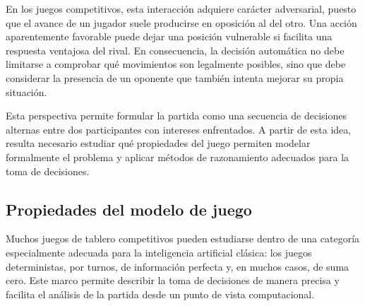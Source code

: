 En los juegos competitivos, esta interacción adquiere carácter adversarial, puesto que el avance de un jugador suele producirse en oposición al del otro. Una acción aparentemente favorable puede dejar una posición vulnerable si facilita una respuesta ventajosa del rival. En consecuencia, la decisión automática no debe limitarse a comprobar qué movimientos son legalmente posibles, sino que debe considerar la presencia de un oponente que también intenta mejorar su propia situación.

Esta perspectiva permite formular la partida como una secuencia de decisiones alternas entre dos participantes con intereses enfrentados. A partir de esta idea, resulta necesario estudiar qué propiedades del juego permiten modelar formalmente el problema y aplicar métodos de razonamiento adecuados para la toma de decisiones.


\subsection{Propiedades del modelo de juego}

Muchos juegos de tablero competitivos pueden estudiarse dentro de una categoría especialmente adecuada para la inteligencia artificial clásica: los juegos deterministas, por turnos, de información perfecta y, en muchos casos, de suma cero. Este marco permite describir la toma de decisiones de manera precisa y facilita el análisis de la partida desde un punto de vista computacional.

